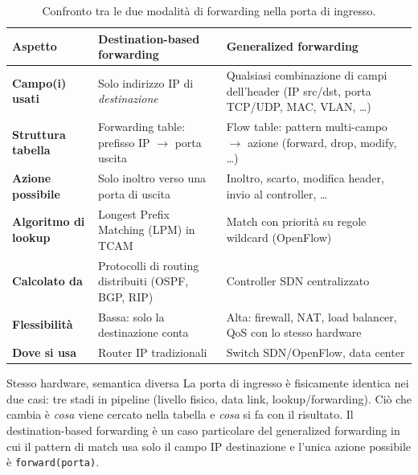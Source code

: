 \documentclass[a4paper,12pt]{report}
\begin{document}
\begin{table}[H]
\centering
\caption{Confronto tra le due modalità di forwarding nella porta di
ingresso.}
\label{tab:dest_vs_gen}
\begin{tabularx}{\textwidth}{lXX}
\toprule
\textbf{Aspetto}
    & \textbf{Destination-based forwarding}
    & \textbf{Generalized forwarding} \\
\midrule
\textbf{Campo(i) usati}
    & Solo indirizzo IP di \emph{destinazione}
    & Qualsiasi combinazione di campi dell'header
      (IP src/dst, porta TCP/UDP, MAC, VLAN, \ldots) \\
\addlinespace
\textbf{Struttura tabella}
    & Forwarding table: prefisso IP $\to$ porta uscita
    & Flow table: pattern multi-campo $\to$ azione
      (forward, drop, modify, \ldots) \\
\addlinespace
\textbf{Azione possibile}
    & Solo inoltro verso una porta di uscita
    & Inoltro, scarto, modifica header, invio
      al controller, \ldots \\
\addlinespace
\textbf{Algoritmo di lookup}
    & Longest Prefix Matching (LPM) in TCAM
    & Match con priorità su regole wildcard
      (OpenFlow) \\
\addlinespace
\textbf{Calcolato da}
    & Protocolli di routing distribuiti
      (OSPF, BGP, RIP)
    & Controller SDN centralizzato \\
\addlinespace
\textbf{Flessibilità}
    & Bassa: solo la destinazione conta
    & Alta: firewall, NAT, load balancer,
      QoS con lo stesso hardware \\
\addlinespace
\textbf{Dove si usa}
    & Router IP tradizionali
    & Switch SDN/OpenFlow, data center \\
\bottomrule
\end{tabularx}
\end{table}

\begin{notebox}{Stesso hardware, semantica diversa}
La porta di ingresso è fisicamente identica nei due casi: tre stadi in
pipeline (livello fisico, data link, lookup/forwarding). Ciò che cambia
è \emph{cosa} viene cercato nella tabella e \emph{cosa} si fa con il
risultato. Il destination-based forwarding è un caso particolare del
generalized forwarding in cui il pattern di match usa solo il campo IP
destinazione e l'unica azione possibile è \texttt{forward(porta)}.
\end{notebox}

\end{document}
